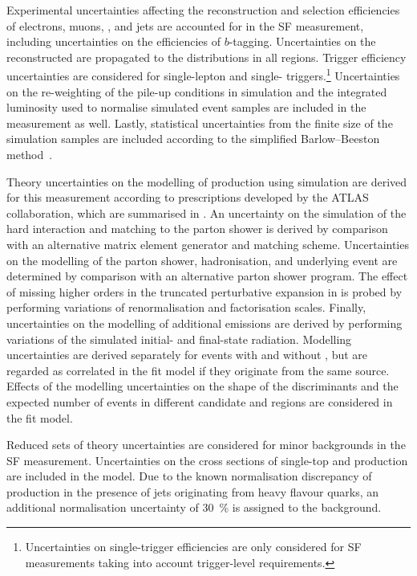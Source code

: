 Experimental uncertainties affecting the reconstruction and selection
efficiencies of electrons, muons, \tauhadvis, and jets are accounted for in the
SF measurement, including uncertainties on the efficiencies of
$b$-tagging. Uncertainties on the reconstructed \pTmissAbs are propagated to the
\mTW distributions in all regions. Trigger efficiency uncertainties are
considered for single-lepton and single-\tauhadvis
triggers.\footnote{Uncertainties on single-\tauhadvis trigger efficiencies are
  only considered for SF measurements taking into account trigger-level \tauid
  requirements.}  Uncertainties on the re-weighting of the pile-up conditions in
simulation and the integrated luminosity used to normalise simulated event
samples are included in the measurement as well. Lastly, statistical
uncertainties from the finite size of the simulation samples are included
according to the simplified Barlow--Beeston method~\cite{barlow1993,conway2011}.

Theory uncertainties on the modelling of \ttbar production using simulation are
derived for this measurement according to prescriptions developed by the ATLAS
collaboration, which are summarised in . An
uncertainty on the simulation of the hard interaction and matching to the parton
shower is derived by comparison with an alternative matrix element generator and
matching scheme. Uncertainties on the modelling of the parton shower,
hadronisation, and underlying event are determined by comparison with an
alternative parton shower program. The effect of missing higher orders in the
truncated perturbative expansion in \alphas is probed by performing variations
of renormalisation and factorisation scales. Finally, uncertainties on the
modelling of additional emissions are derived by performing variations of the
simulated initial- and final-state radiation. Modelling uncertainties are
derived separately for \ttbar events with and without \faketauhadvis, but are
regarded as correlated in the fit model if they originate from the same
source. Effects of the \ttbar modelling uncertainties on the shape of the \mTW
discriminants and the expected number of events in different \tauhadvis
candidate \Ntracks and \pT regions are considered in the fit model.

Reduced sets of theory uncertainties are considered for minor backgrounds in the
SF measurement. Uncertainties on the cross sections of single-top and \Vjets
production are included in the model. Due to the known normalisation discrepancy
of \Vjets production in the presence of jets originating from heavy flavour
quarks, an additional normalisation uncertainty of \SI{30}{\percent} is assigned
to the \Vjets background.


